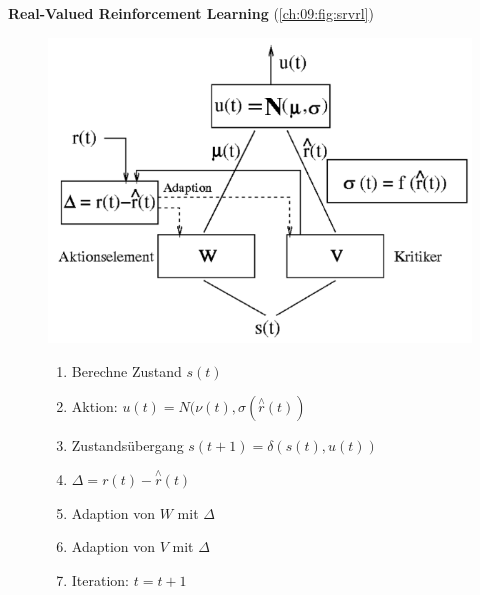 \textbf{Real-Valued Reinforcement Learning} (\autoref{ch:09:fig:srvrl})
\begin{figure}[h!]
	\label{ch:09:fig:srvrl}
	\begin{minipage}{0.5\linewidth}
		\centering
		\includegraphics[width=\textwidth]{figures/srvrl.png}
	\end{minipage}
	\begin{minipage}{0.5\linewidth}
		\begin{enumerate}
			\item Berechne Zustand $s(t)$
			\item Aktion: $u(t) = N(\nu (t), \sigma(\overset{\wedge}{r}(t))$
			\item Zustandsübergang $s(t + 1) = \delta (s(t),u(t))$
			\item $\Delta = r(t) - \overset{\wedge}{r}(t)$
			\item Adaption von $W$ mit $\Delta$
			\item Adaption von $V$ mit $\Delta$
			\item Iteration: $t = t + 1$
		\end{enumerate}	
	\end{minipage}
\end{figure}
